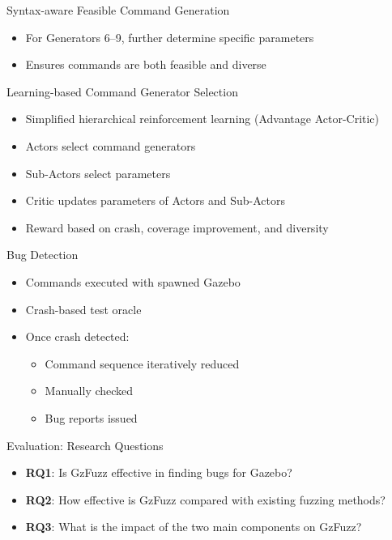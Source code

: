 \documentclass{beamer}
\begin{document}
\begin{frame}{Syntax-aware Feasible Command Generation}
\begin{itemize}
\item For Generators 6–9, further determine specific parameters
\item Ensures commands are both feasible and diverse
\end{itemize}
\end{frame}

\begin{frame}{Learning-based Command Generator Selection}
\begin{itemize}
\item Simplified hierarchical reinforcement learning (Advantage Actor-Critic)
\item Actors select command generators
\item Sub-Actors select parameters
\item Critic updates parameters of Actors and Sub-Actors
\item Reward based on crash, coverage improvement, and diversity
\end{itemize}
\end{frame}

\begin{frame}{Bug Detection}
\begin{itemize}
\item Commands executed with spawned Gazebo
\item Crash-based test oracle
\item Once crash detected:
  \begin{itemize}
  \item Command sequence iteratively reduced
  \item Manually checked
  \item Bug reports issued
  \end{itemize}
\end{itemize}
\end{frame}

\begin{frame}{Evaluation: Research Questions}
\begin{itemize}
\item \textbf{RQ1}: Is GzFuzz effective in finding bugs for Gazebo?
\item \textbf{RQ2}: How effective is GzFuzz compared with existing fuzzing methods?
\item \textbf{RQ3}: What is the impact of the two main components on GzFuzz?
\end{itemize}
\end{frame}
\end{document}
